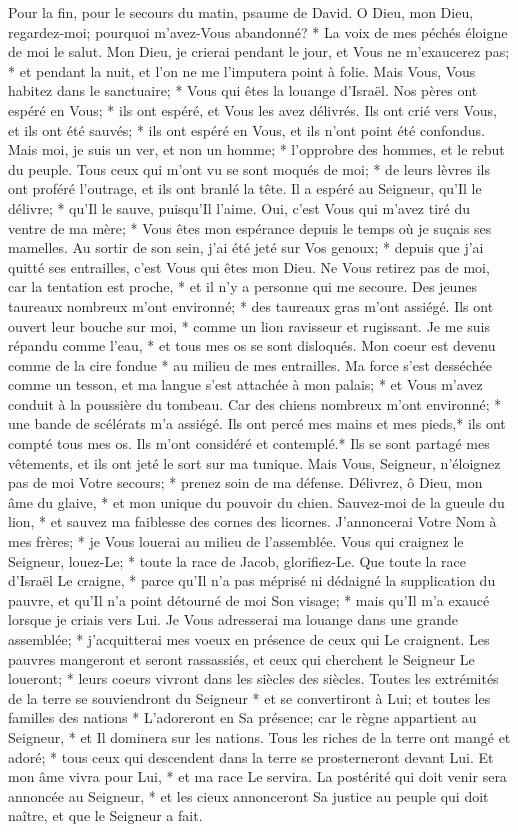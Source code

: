 Pour la fin, pour le secours du matin, psaume de David.
O Dieu, mon Dieu, regardez-moi; pourquoi m'avez-Vous abandonné? * La voix de mes péchés éloigne de moi le salut.
Mon Dieu, je crierai pendant le jour, et Vous ne m'exaucerez pas; * et pendant la nuit, et l'on ne me l'imputera point à folie.
Mais Vous, Vous habitez dans le sanctuaire; * Vous qui êtes la louange d'Israël.
Nos pères ont espéré en Vous; * ils ont espéré, et Vous les avez délivrés.
Ils ont crié vers Vous, et ils ont été sauvés; * ils ont espéré en Vous, et ils n'ont point été confondus.
Mais moi, je suis un ver, et non un homme; * l'opprobre des hommes, et le rebut du peuple.
Tous ceux qui m'ont vu se sont moqués de moi; * de leurs lèvres ils ont proféré l'outrage, et ils ont branlé la tête.
Il a espéré au Seigneur, qu'Il le délivre; * qu'Il le sauve, puisqu'Il l'aime.
Oui, c'est Vous qui m'avez tiré du ventre de ma mère; * Vous êtes mon espérance depuis le temps où je suçais ses mamelles.
Au sortir de son sein, j'ai été jeté sur Vos genoux; * depuis que j'ai quitté ses entrailles, c'est Vous qui êtes mon Dieu.
Ne Vous retirez pas de moi, car la tentation est proche, * et il n'y a personne qui me secoure.
Des jeunes taureaux nombreux m'ont environné; * des taureaux gras m'ont assiégé.
Ils ont ouvert leur bouche sur moi, * comme un lion ravisseur et rugissant.
Je me suis répandu comme l'eau, * et tous mes os se sont disloqués. Mon coeur est devenu comme de la cire fondue * au milieu de mes entrailles.
Ma force s'est desséchée comme un tesson, et ma langue s'est attachée à mon palais; * et Vous m'avez conduit à la poussière du tombeau.
Car des chiens nombreux m'ont environné; * une bande de scélérats m'a assiégé. Ils ont percé mes mains et mes pieds,*
ils ont compté tous mes os. Ils m'ont considéré et contemplé.*
Ils se sont partagé mes vêtements, et ils ont jeté le sort sur ma tunique.
Mais Vous, Seigneur, n'éloignez pas de moi Votre secours; * prenez soin de ma défense.
Délivrez, ô Dieu, mon âme du glaive, * et mon unique du pouvoir du chien.
Sauvez-moi de la gueule du lion, * et sauvez ma faiblesse des cornes des licornes.
J'annoncerai Votre Nom à mes frères; * je Vous louerai au milieu de l'assemblée.
Vous qui craignez le Seigneur, louez-Le; * toute la race de Jacob, glorifiez-Le.
Que toute la race d'Israël Le craigne, * parce qu'Il n'a pas méprisé ni dédaigné la supplication du pauvre, et qu'Il n'a point détourné de moi Son visage; * mais qu'Il m'a exaucé lorsque je criais vers Lui.
Je Vous adresserai ma louange dans une grande assemblée; * j'acquitterai mes voeux en présence de ceux qui Le craignent.
Les pauvres mangeront et seront rassassiés, et ceux qui cherchent le Seigneur Le loueront; * leurs coeurs vivront dans les siècles des siècles.
Toutes les extrémités de la terre se souviendront du Seigneur * et se convertiront à Lui; et toutes les familles des nations * L'adoreront en Sa présence;
car le règne appartient au Seigneur, * et Il dominera sur les nations.
Tous les riches de la terre ont mangé et adoré; * tous ceux qui descendent dans la terre se prosterneront devant Lui.
Et mon âme vivra pour Lui, * et ma race Le servira.
La postérité qui doit venir sera annoncée au Seigneur, * et les cieux annonceront Sa justice au peuple qui doit naître, et que le Seigneur a fait.

